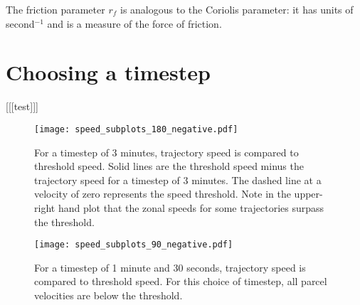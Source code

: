 The friction parameter $r_f$ is analogous to the Coriolis parameter: it has units of second$^{-1}$ and is a measure of the force of friction.

\section{Choosing a timestep} \label{sec:timestep}
[[[test]]]

\begin{figure}
    \texttt{[image: speed\_subplots\_180\_negative.pdf]}
    \centering
    \caption{For a timestep of 3 minutes, trajectory speed is compared to threshold speed.
    Solid lines are the threshold speed minus the trajectory speed for a timestep of 3 minutes. 
    The dashed line at a velocity of zero represents the speed threshold.
    Note in the upper-right hand plot that the zonal speeds for some trajectories surpass the threshold. }
    \label{}
\end{figure}

\begin{figure}
    \texttt{[image: speed\_subplots\_90\_negative.pdf]}
    \centering
    \caption{For a timestep of 1 minute and 30 seconds, trajectory speed is compared to threshold speed.
    For this choice of timestep, all parcel velocities are below the threshold.}
    \label{}
\end{figure}
